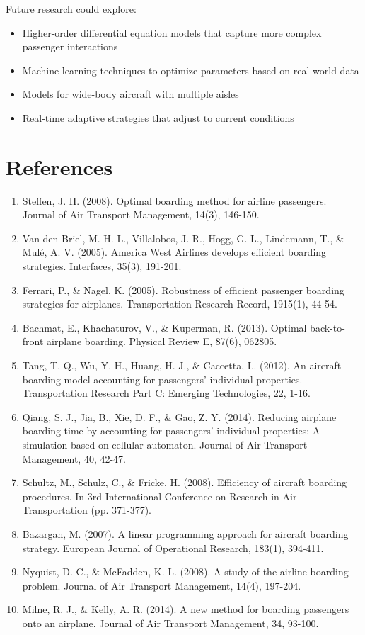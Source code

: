 \documentclass[12pt,a4paper]{article}
\begin{document}
Future research could explore:
\begin{itemize}
    \item Higher-order differential equation models that capture more complex passenger interactions
    \item Machine learning techniques to optimize parameters based on real-world data
    \item Models for wide-body aircraft with multiple aisles
    \item Real-time adaptive strategies that adjust to current conditions
\end{itemize}

\section{References}
\begin{enumerate}
\item Steffen, J. H. (2008). Optimal boarding method for airline passengers. Journal of Air Transport Management, 14(3), 146-150.
\item Van den Briel, M. H. L., Villalobos, J. R., Hogg, G. L., Lindemann, T., \& Mulé, A. V. (2005). America West Airlines develops efficient boarding strategies. Interfaces, 35(3), 191-201.
\item Ferrari, P., \& Nagel, K. (2005). Robustness of efficient passenger boarding strategies for airplanes. Transportation Research Record, 1915(1), 44-54.
\item Bachmat, E., Khachaturov, V., \& Kuperman, R. (2013). Optimal back-to-front airplane boarding. Physical Review E, 87(6), 062805.
\item Tang, T. Q., Wu, Y. H., Huang, H. J., \& Caccetta, L. (2012). An aircraft boarding model accounting for passengers' individual properties. Transportation Research Part C: Emerging Technologies, 22, 1-16.
\item Qiang, S. J., Jia, B., Xie, D. F., \& Gao, Z. Y. (2014). Reducing airplane boarding time by accounting for passengers' individual properties: A simulation based on cellular automaton. Journal of Air Transport Management, 40, 42-47.
\item Schultz, M., Schulz, C., \& Fricke, H. (2008). Efficiency of aircraft boarding procedures. In 3rd International Conference on Research in Air Transportation (pp. 371-377).
\item Bazargan, M. (2007). A linear programming approach for aircraft boarding strategy. European Journal of Operational Research, 183(1), 394-411.
\item Nyquist, D. C., \& McFadden, K. L. (2008). A study of the airline boarding problem. Journal of Air Transport Management, 14(4), 197-204.
\item Milne, R. J., \& Kelly, A. R. (2014). A new method for boarding passengers onto an airplane. Journal of Air Transport Management, 34, 93-100.
\end{enumerate}
\end{document}
